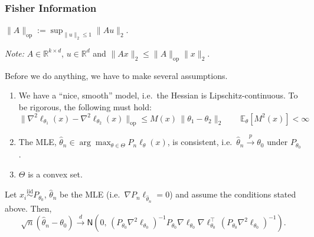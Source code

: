 \subsubsection{Fisher Information}
\begin{defn}
$\|A\|_{\mathrm{op}} := \sup_{\|u\|_2 \le 1}\|Au\|_2$.

\textit{Note:} $A \in \mathbb{R}^{k\times d}$, $u \in \mathbb{R}^d$ and 
$\|Ax\|_2 \le \|A\|_{\mathrm{op}}\|x\|_2$.
\end{defn}

Before we do anything, we have to make several assumptions.
\begin{enumerate}
  \item We have a ``nice, smooth'' model, i.e.\ the Hessian is Lipschitz-continuous. 
  To be rigorous, the following must hold:
  \[
    \big\|\nabla^2 \ell_{\theta_1}(x) - \nabla^2 \ell_{\theta_2}(x)\big\|_{\mathrm{op}} 
    \le M(x)\,\|\theta_1 - \theta_2\|_2
    \qquad \mathbb{E}_\theta[M^2(x)] < \infty
  \]

  \item The MLE, $\hat{\theta}_n \in \arg\max_{\theta \in \Theta} P_n \ell_\theta(x)$, 
  is consistent, i.e.\ $\hat{\theta}_n \xrightarrow{p} \theta_0$ under $P_{\theta_0}$.

  \item $\Theta$ is a convex set.
\end{enumerate}

\begin{thm}
Let $x_i \stackrel{\mathrm{iid}}{\sim} P_{\theta_0}$, $\hat{\theta}_n$ be the MLE 
(i.e.\ $\nabla P_n \ell_{\hat{\theta}_n} = 0$) and assume the conditions stated above. 
Then,
\[
  \sqrt{n}(\hat{\theta}_n - \theta_0) \xrightarrow{d} 
  \mathsf{N}\!\left(0,\, (P_{\theta_0}\nabla^2 \ell_{\theta_0})^{-1} 
  P_{\theta_0}\nabla \ell_{\theta_0}\nabla \ell_{\theta_0}^\top\, 
  (P_{\theta_0}\nabla^2 \ell_{\theta_0})^{-1}\right).
\]
\end{thm}

